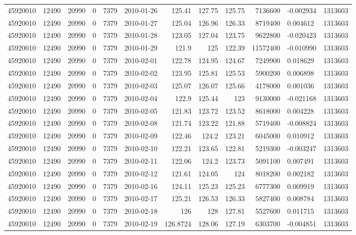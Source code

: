 \begin{tabular}{l | r | r | r | r | l | r | r | r | r | l | r}
45920010 & 12490 & 20990 & 0 & 7379 & 2010-01-26 & 125.41 & 127.75 & 125.75 & 7136600 & -0.002934 & 1313603 \\
45920010 & 12490 & 20990 & 0 & 7379 & 2010-01-27 & 125.04 & 126.96 & 126.33 & 8719400 & 0.004612 & 1313603 \\
45920010 & 12490 & 20990 & 0 & 7379 & 2010-01-28 & 123.05 & 127.04 & 123.75 & 9622800 & -0.020423 & 1313603 \\
45920010 & 12490 & 20990 & 0 & 7379 & 2010-01-29 & 121.9 & 125 & 122.39 & 11572400 & -0.010990 & 1313603 \\
45920010 & 12490 & 20990 & 0 & 7379 & 2010-02-01 & 122.78 & 124.95 & 124.67 & 7249900 & 0.018629 & 1313603 \\
45920010 & 12490 & 20990 & 0 & 7379 & 2010-02-02 & 123.95 & 125.81 & 125.53 & 5900200 & 0.006898 & 1313603 \\
45920010 & 12490 & 20990 & 0 & 7379 & 2010-02-03 & 125.07 & 126.07 & 125.66 & 4178000 & 0.001036 & 1313603 \\
45920010 & 12490 & 20990 & 0 & 7379 & 2010-02-04 & 122.9 & 125.44 & 123 & 9130000 & -0.021168 & 1313603 \\
45920010 & 12490 & 20990 & 0 & 7379 & 2010-02-05 & 121.83 & 123.72 & 123.52 & 8618000 & 0.004228 & 1313603 \\
45920010 & 12490 & 20990 & 0 & 7379 & 2010-02-08 & 121.74 & 123.22 & 121.88 & 5719400 & -0.008824 & 1313603 \\
45920010 & 12490 & 20990 & 0 & 7379 & 2010-02-09 & 122.46 & 124.2 & 123.21 & 6045000 & 0.010912 & 1313603 \\
45920010 & 12490 & 20990 & 0 & 7379 & 2010-02-10 & 122.21 & 123.65 & 122.81 & 5219300 & -0.003247 & 1313603 \\
45920010 & 12490 & 20990 & 0 & 7379 & 2010-02-11 & 122.06 & 124.2 & 123.73 & 5091100 & 0.007491 & 1313603 \\
45920010 & 12490 & 20990 & 0 & 7379 & 2010-02-12 & 121.61 & 124.05 & 124 & 8018200 & 0.002182 & 1313603 \\
45920010 & 12490 & 20990 & 0 & 7379 & 2010-02-16 & 124.11 & 125.23 & 125.23 & 6777300 & 0.009919 & 1313603 \\
45920010 & 12490 & 20990 & 0 & 7379 & 2010-02-17 & 125.21 & 126.53 & 126.33 & 5827400 & 0.008784 & 1313603 \\
45920010 & 12490 & 20990 & 0 & 7379 & 2010-02-18 & 126 & 128 & 127.81 & 5527600 & 0.011715 & 1313603 \\
45920010 & 12490 & 20990 & 0 & 7379 & 2010-02-19 & 126.8724 & 128.06 & 127.19 & 6303700 & -0.004851 & 1313603 \\

\end{tabular}
